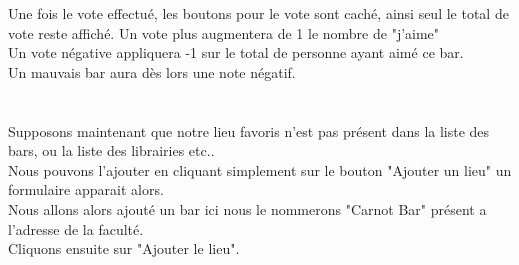 \documentclass[10pt,a4paper, landscape]{report}
\begin{document}
{{{{{{\newpage
Une fois le vote effectué, les boutons pour le vote sont caché, ainsi seul le total de vote reste affiché.
Un vote plus augmentera de 1 le nombre de "j'aime" \\
Un vote négative appliquera -1 sur le total de personne ayant aimé ce bar. \\

Un mauvais bar aura dès lors une note négatif. \\
{%
\setlength{\fboxsep}{0pt}%
\setlength{\fboxrule}{2pt}%
%

\newpage
\section{}

Supposons maintenant que notre lieu favoris n'est pas présent dans la liste des bars, ou la liste des librairies etc.. \\
Nous pouvons l'ajouter en cliquant simplement sur le bouton "Ajouter un lieu" un formulaire apparait alors. \\

Nous allons alors ajouté un bar ici nous le nommerons "Carnot Bar" présent a l'adresse de la faculté. \\
Cliquons ensuite sur "Ajouter le lieu".
{%
\setlength{\fboxsep}{0pt}%
\setlength{\fboxrule}{2pt}%
%

}}}}}}}}
\end{document}
